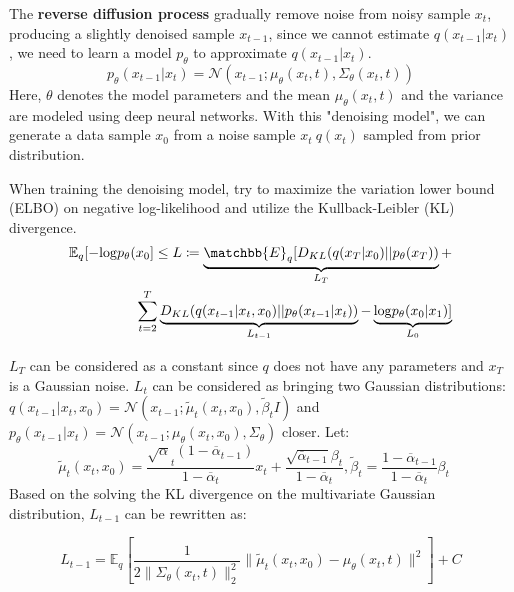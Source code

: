 The \textbf{reverse diffusion process} gradually remove noise from noisy sample $x_t$, producing a slightly denoised sample $x_{t-1}$, since we cannot estimate $q(x_{t-1} | x_t)$, we need to learn a model $p_\theta$ to approximate $q(x_{t-1} | x_t)$.
\begin{equation} \label{eq:4}
    p_\theta(x_{t-1} | x_t) = \mathcal{N}(x_{t-1}; \mu_\theta(x_t, t), \Sigma_\theta(x_t, t))
\end{equation}
Here, $\theta$ denotes the model parameters and the mean $\mu_\theta(x_t, t)$ and the variance are modeled using deep neural networks. With this "denoising model", we can generate a data sample $x_0$ from a noise sample $x_t ~ q(x_t)$ sampled from prior distribution. 

When training the denoising model, \cite{ho2020denoising} try to maximize the variation lower bound (ELBO) on negative log-likelihood and utilize the Kullback-Leibler (KL) divergence.
\begin{equation} \label{eq:5}
\begin{split}
    \mathbb{E}_q[-\mathrm{log}p_\theta(x_0] \leq L \coloneqq \underbrace{\matchbb{E}_q[D_{KL}(q(x_T|x_0) || p_\theta(x_T))}_{L_T} + \\ \sum_{t=2}^{T}\underbrace{D_{KL}(q(x_{t-1}|x_t, x_0) || p_\theta(x_{t-1}|x_t))}_{L_{t-1}} - \underbrace{\mathrm{log}p_\theta(x_0|x_1)]}_{L_0}
\end{split}
\end{equation}

$L_T$ can be considered as a constant since $q$ does not have any parameters and $x_T$ is a Gaussian noise. $L_t$ can be considered as bringing two Gaussian distributions: $q(x_{t-1}|x_t, x_0) = \mathcal{N}(x_{t-1};\tilde{\mu}_t(x_t, x_0), \tilde{\beta}_tI)$ and $p_\theta(x_{t-1}|x_t) = \mathcal{N}(x_{t-1}; \mu_\theta(x_t, x_0), \Sigma_\theta)$ closer. Let:
\begin{equation} \label{eq:6}
    \tilde{\mu}_t(x_t, x_0) = \frac{\sqrt{\alpha}_t(1 - \overline{\alpha}_{t-1})}{1 - \overline{\alpha}_t}x_t + \frac{\sqrt{\overline{\alpha}_{t-1}}\beta_t}{1 - \overline{\alpha}_t}, \tilde{\beta}_t = \frac{1 - \overline{\alpha}_{t-1}}{1 - \overline{\alpha}_t}\beta_t \quad
\end{equation}
Based on the solving the KL divergence on the multivariate Gaussian distribution, $L_{t-1}$ can be rewritten as:

\begin{equation} \label{eq:7}
    L_{t-1} = \mathbb{E}_q[ \frac{1}{2\|\Sigma_\theta(x_t, t)\|_2^2} \|\tilde{\mu}_t(x_t, x_0) - \mu_\theta(x_t, t) \|^2 ] + C
\end{equation}

